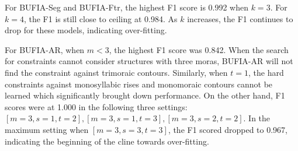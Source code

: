 \documentclass[11pt]{article}
\begin{document}
For BUFIA-Seg and BUFIA-Ftr, the highest F1 score is 0.992 when \(k=3\).
For \(k=4\), the F1 is still close to ceiling at 0.984.
As \(k\) increases, the F1 continues to drop for these models,
indicating over-fitting.

For BUFIA-AR, when \(m<3\), the highest F1 score was 0.842.
When the search for constraints cannot consider structures with three moras,
BUFIA-AR will not find the constraint against trimoraic contours.
Similarly, when \(t=1\), the hard constraints against monosyllabic rises
and monomoraic contours cannot be learned which significantly brought down
performance.
On the other hand, F1 scores were at 1.000 in the following three settings:
\([m=3, s=1, t=2], [m=3, s=1, t=3], [m=3, s=2, t=2]\).
In the maximum setting when \([m=3, s=3, t=3]\), the F1 scored dropped to 0.967,
indicating the beginning of the cline towards over-fitting.
\end{document}
